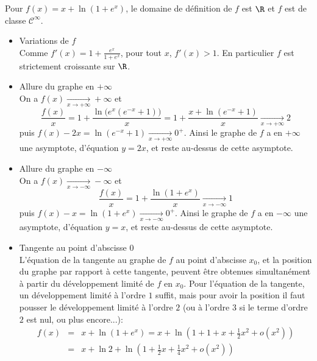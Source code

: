 {\begin{enumerate}
{\begin{center}
\end{center}
Pour $f(x)=x+\ln(1+e^x)$, le domaine de définition de $f$ est $\R$ et $f$ est de classe $\mathcal{C}^\infty$.
\begin{itemize}
\item Variations de $f$\\
Comme $f'(x)=1+\frac{e^x}{1+e^x}$, pour tout $x$, $f'(x)>1$. En particulier $f$ est strictement croissante sur $\R$.
\item Allure du graphe en $+\infty$\\
On a $f(x)\xrightarrow[x\to +\infty]{}+\infty$ et
$$\frac{f(x)}{x}=1+\frac{\ln\big( e^x (e^{-x}+1)\big)}{x}=1+\frac{x+\ln(e^{-x}+1)}{x}\xrightarrow[x\to +\infty]{}2$$
puis $f(x)-2x=\ln(e^{-x}+1)\xrightarrow[x\to +\infty]{}0^+$. Ainsi le graphe de $f$ a en $+\infty$ une asymptote, d'équation $y=2x$, et reste au-dessus de cette asymptote.
\item Allure du graphe en $-\infty$\\
On a $f(x)\xrightarrow[x\to -\infty]{}-\infty$ et
$$\frac{f(x)}{x}=1+\frac{\ln(1+e^x)}{x}\xrightarrow[x\to -\infty]{}1$$
puis $f(x)-x=\ln(1+e^{x})\xrightarrow[x\to -\infty]{}0^+$. Ainsi le graphe de $f$ 
a en $-\infty$ une asymptote, d'équation $y=x$, et reste au-dessus de cette asymptote.
\item Tangente au point d'abscisse $0$\\
L'équation de la tangente au graphe de $f$ au point d'abscisse $x_0$, 
et la position du graphe par rapport à cette tangente, peuvent \^etre 
obtenues simultanément à partir du développement limité de $f$ en $x_0$. 
Pour l'équation de la tangente, un développement limité à l'ordre $1$ suffit, 
mais pour avoir la position il faut pousser le développement limité à l'ordre $2$ 
(ou à l'ordre $3$ si le terme d'ordre $2$ est nul, ou plus encore...):
\begin{eqnarray*}
f(x)&=&x+\ln(1+e^x)=x+\ln\left(1+1+x+\frac{1}{2}x^2+o(x^2)\right)\\
 &=&x+\ln 2+\ln\left(1+\frac{1}{2}x+\frac{1}{4}x^2+o(x^2)\right)\\

\end{eqnarray*}
\end{itemize}}
\end{enumerate}}
